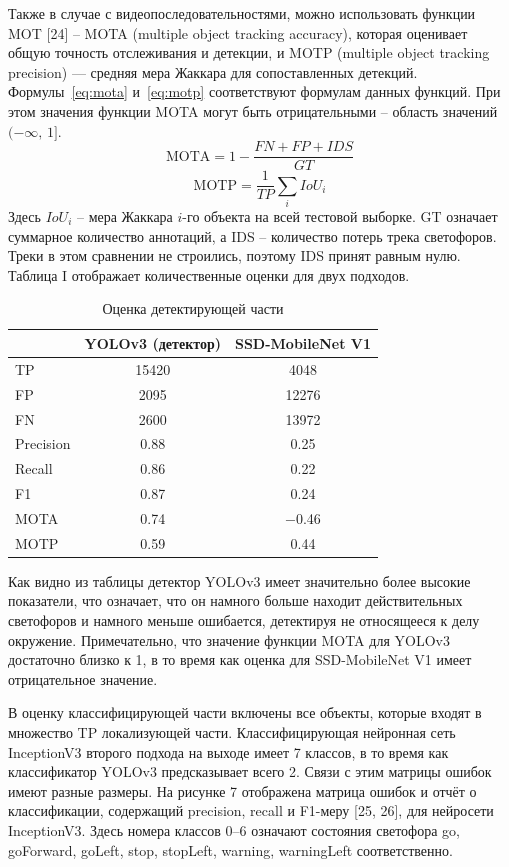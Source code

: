 \documentclass{misisarticle}
\begin{document}
Также в случае с видеопоследовательностями, можно использовать функции MOT [24] – MOTA (multiple object tracking accuracy), которая оценивает общую точность отслеживания и детекции, и MOTP (multiple object tracking precision) — средняя мера Жаккара для сопоставленных детекций. Формулы~\eqref{eq:mota} и~\eqref{eq:motp} соответствуют формулам данных функций. При этом значения функции MOTA могут быть отрицательными – область значений $(-\infty,\, 1]$.
\begin{equation}
  \label{eq:mota}
  \mathrm{MOTA} = 1 - \frac{FN + FP + IDS}{GT}
\end{equation}
\begin{equation}
  \label{eq:motp}
  \mathrm{MOTP} = \frac{1}{TP}\sum_{i} IoU_i
\end{equation}
Здесь $IoU_i$ – мера Жаккара $i$-го объекта на всей тестовой выборке. GT означает суммарное количество аннотаций, а IDS – количество потерь трека светофоров. Треки в этом сравнении не строились, поэтому IDS принят равным нулю. Таблица I отображает количественные оценки для двух подходов.

\begin{table}[htbp]
  \caption{Оценка детектирующей части}
  \label{tab:detector}
  \centering
  \begin{tabular}{lcc}
    \toprule
    & YOLOv3 (детектор) & SSD-MobileNet V1 \\
    \midrule
    TP & 15420 & 4048 \\
    FP & 2095 & 12276 \\
    FN & 2600 & 13972 \\
    Precision & 0.88 & 0.25 \\
    Recall & 0.86 & 0.22 \\
    F1 & 0.87 & 0.24 \\
    MOTA & 0.74 & $-$0.46 \\
    MOTP & 0.59 & 0.44 \\
    \bottomrule
  \end{tabular}
\end{table}

Как видно из таблицы детектор YOLOv3 имеет значительно более высокие показатели, что означает, что он намного больше находит действительных светофоров и намного меньше ошибается, детектируя не относящееся к делу окружение. Примечательно, что значение функции MOTA для YOLOv3 достаточно близко к 1, в то время как оценка для SSD-MobileNet V1 имеет отрицательное значение.

В оценку классифицирующей части включены все объекты, которые входят в множество TP локализующей части. Классифицирующая нейронная сеть InceptionV3 второго подхода на выходе имеет 7 классов, в то время как классификатор YOLOv3 предсказывает всего 2. Связи с этим матрицы ошибок имеют разные размеры. На рисунке 7 отображена матрица ошибок и отчёт о классификации, содержащий precision, recall и F1-меру [25, 26], для нейросети InceptionV3. Здесь номера классов 0–6 означают состояния светофора go, goForward, goLeft, stop, stopLeft, warning, warningLeft соответственно.
\end{document}
